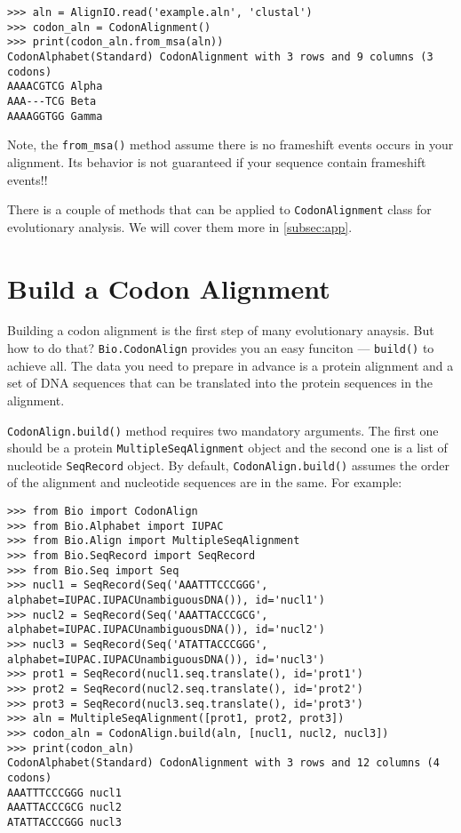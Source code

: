 \begin{verbatim}
>>> aln = AlignIO.read('example.aln', 'clustal')
>>> codon_aln = CodonAlignment()
>>> print(codon_aln.from_msa(aln))
CodonAlphabet(Standard) CodonAlignment with 3 rows and 9 columns (3 codons)
AAAACGTCG Alpha
AAA---TCG Beta
AAAAGGTGG Gamma
\end{verbatim}

Note, the \verb|from_msa()| method assume there is no frameshift
events occurs in your alignment. Its behavior is not guaranteed if your
sequence contain frameshift events!!

There is a couple of methods that can be applied to
\verb|CodonAlignment| class for evolutionary analysis. We will cover
them more in \ref{subsec:app}.

\section{Build a Codon Alignment}

Building a codon alignment is the first step of many evolutionary
anaysis. But how to do that? \verb|Bio.CodonAlign| provides you an
easy funciton --- \verb|build()| to achieve all. The data you need to
prepare in advance is a protein alignment and a set of DNA sequences
that can be translated into the protein sequences in the alignment.

\verb|CodonAlign.build()| method requires two mandatory arguments. The
first one should be a protein \verb|MultipleSeqAlignment| object and
the second one is a list of nucleotide \verb|SeqRecord| object. By
default, \verb|CodonAlign.build()| assumes the order of the alignment
and nucleotide sequences are in the same. For example:

\begin{verbatim}
>>> from Bio import CodonAlign
>>> from Bio.Alphabet import IUPAC
>>> from Bio.Align import MultipleSeqAlignment
>>> from Bio.SeqRecord import SeqRecord
>>> from Bio.Seq import Seq
>>> nucl1 = SeqRecord(Seq('AAATTTCCCGGG', alphabet=IUPAC.IUPACUnambiguousDNA()), id='nucl1')
>>> nucl2 = SeqRecord(Seq('AAATTACCCGCG', alphabet=IUPAC.IUPACUnambiguousDNA()), id='nucl2')
>>> nucl3 = SeqRecord(Seq('ATATTACCCGGG', alphabet=IUPAC.IUPACUnambiguousDNA()), id='nucl3')
>>> prot1 = SeqRecord(nucl1.seq.translate(), id='prot1')
>>> prot2 = SeqRecord(nucl2.seq.translate(), id='prot2')
>>> prot3 = SeqRecord(nucl3.seq.translate(), id='prot3')
>>> aln = MultipleSeqAlignment([prot1, prot2, prot3])
>>> codon_aln = CodonAlign.build(aln, [nucl1, nucl2, nucl3])
>>> print(codon_aln)
CodonAlphabet(Standard) CodonAlignment with 3 rows and 12 columns (4 codons)
AAATTTCCCGGG nucl1
AAATTACCCGCG nucl2
ATATTACCCGGG nucl3
\end{verbatim}


